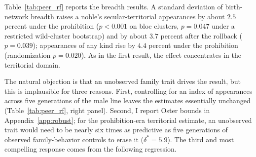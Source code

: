 \documentclass[12pt]{article}
\theoremstyle{definition}
\theoremstyle{remark}
\begin{document}
Table~\ref{tab:peer_rf} reports the breadth results. A standard deviation of birth-network breadth raises a noble's secular-territorial appearances by about $2.5$ percent under the prohibition ($p<0.001$ on bloc clusters, $p=0.047$ under a restricted wild-cluster bootstrap) and by about $3.7$ percent after the rollback ($p=0.039$); appearances of any kind rise by $4.4$ percent under the prohibition (randomization $p=0.020$). As in the first result, the effect concentrates in the territorial domain.

The natural objection is that an unobserved family trait drives the result, but this is implausible for three reasons. First, controlling for an index of appearances across five generations of the male line leaves the estimates essentially unchanged (Table~\ref{tab:peer_rf}, right panel). Second, I report Oster bounds in Appendix~\ref{app:robust}; for the prohibition-era territorial estimate, an unobserved trait would need to be nearly six times as predictive as five generations of observed family-behavior controls to erase it ($\delta^\ast=5.9$). The third and most compelling response comes from the following regression.
\end{document}
